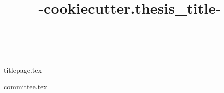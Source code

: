 \documentclass{book}
\title{ {{-cookiecutter.thesis_title-}} }
\author{\givenname\ \surname}
\begin{document}
{titlepage.tex}

{committee.tex}
\end{document}
